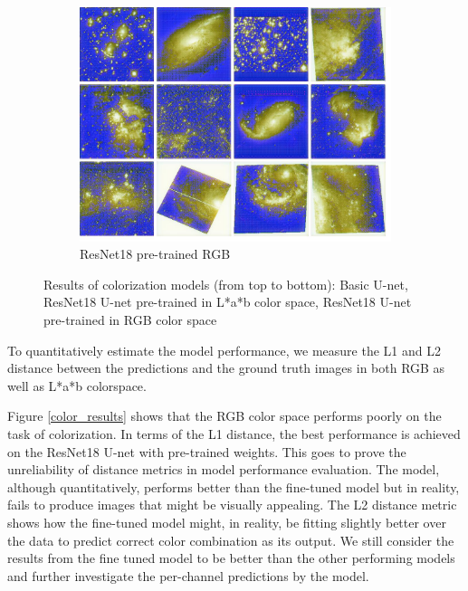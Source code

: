 \documentclass[conference]{IEEEtran}
\begin{document}
\begin{figure}[!htb]
	\begin{subfigure}[b]{0.25\textwidth}
		\centering
		\includegraphics[width=\textwidth]{figures/samples_coco}
		\caption{ResNet18 pre-trained RGB}
		\label{fig: resnet18_rgb}
	\end{subfigure}
	\caption{Results of colorization models (from top to bottom): Basic U-net, ResNet18 U-net pre-trained in L*a*b color space, ResNet18 U-net pre-trained in RGB color space}
	\label{fig: comparisons}
\end{figure}

To quantitatively estimate the model performance, we measure the L1 and L2 distance between the predictions and the ground truth images in both RGB as well as L*a*b colorspace.



Figure \ref{color_results} shows that the RGB color space performs poorly on the task of colorization. In terms of the L1 distance, the best performance is achieved on the ResNet18 U-net with pre-trained weights. This goes to prove the unreliability of distance metrics in model performance evaluation. The model, although quantitatively, performs better than the fine-tuned model but in reality, fails to produce images that might be visually appealing. The L2 distance metric shows how the fine-tuned model might, in reality, be fitting slightly better over the data to predict correct color combination as its output. We still consider the results from the fine tuned model to be better than the other performing models and further investigate the per-channel predictions by the model.
\end{document}
